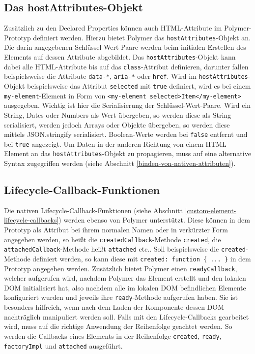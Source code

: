 \subsection{Das hostAttributes-Objekt}\label{das-hostattributes-objekt}

Zusätzlich zu den Declared Properties können auch \ac{HTML}-Attribute im Polymer-Pro\-to\-typ definiert werden. Hierzu bietet Polymer das \texttt{hostAttributes}-Objekt an. Die darin angegebenen Schlüssel-Wert-Paare werden beim initialen Erstellen des Elements auf dessen Attribute abgebildet. Das \texttt{hostAttributes}-Objekt kann dabei alle \ac{HTML}-Attribute bis auf das \texttt{class}-Attribut definieren, darunter fallen beispielsweise die Attribute \texttt{data-*}, \texttt{aria-*} oder \texttt{href}. Wird im \texttt{hostAttributes}-Objekt beispielsweise das Attribut \texttt{selected} mit \texttt{true} definiert, wird es bei einem \texttt{my-element}-Element in Form von \texttt{\textless{}my-element\ selected\textgreater{}Item\textless{}/my-element\textgreater{}} ausgegeben. Wichtig ist hier die Serialisierung der Schlüssel-Wert-Paare. Wird ein String, Dates oder Numbers als Wert übergeben, so werden diese als String serialisiert, werden jedoch Arrays oder Objekte übergeben, so werden diese mittels JSON.stringify serialisiert. Boolean-Werte werden bei \texttt{false} entfernt und bei \texttt{true} angezeigt. Um Daten in der anderen Richtung von einem \ac{HTML}-Element an das \texttt{hostAttributes}-Objekt zu propagieren, muss auf eine alternative Syntax zugegriffen werden (siehe Abschnitt \ref{binden-von-nativen-attributen}).


\subsection{Lifecycle-Callback-Funktionen}\label{lifecycle-callback-funktionen}

Die nativen Lifecycle-Callback-Funktionen (siehe Abschnitt \ref{custom-element-lifecycle-callbacks}) werden ebenso von Polymer unterstützt. Diese können in dem Prototyp als Attribut bei ihrem normalen Namen oder in verkürzter Form angegeben werden, so heißt die \texttt{createdCallback}-Methode \texttt{created}, die \texttt{attachedCallback}-Methode heißt \texttt{attached} etc.. Soll beispielsweise die \texttt{created}-Methode definiert werden, so kann diese mit \texttt{created:\ function\ \{\ ...\ \}} in dem Prototyp angegeben werden. Zusätzlich bietet Polymer einen \texttt{readyCallback}, welcher aufgerufen wird, nachdem Polymer das Element erstellt und den lokalen \ac{DOM} initialisiert hat, also nachdem alle im lokalen \ac{DOM} befindlichen Elemente konfiguriert wurden und jeweils ihre \texttt{ready}-Methode aufgerufen haben. Sie ist besonders hilfreich, wenn nach dem Laden der Komponente dessen \ac{DOM} nachträglich manipuliert werden soll. Falls mit den Lifecycle-Callbacks gearbeitet wird, muss auf die richtige Anwendung der Reihenfolge geachtet werden. So werden die Callbacks eines Elements in der Reihenfolge \texttt{created}, \texttt{ready}, \texttt{factoryImpl} und \texttt{attached} ausgeführt.


